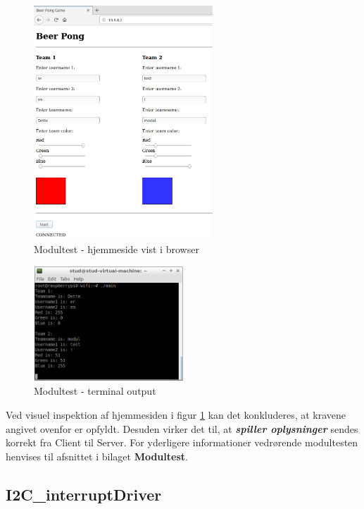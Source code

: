 \documentclass[Rapport/Rapport_main.tex]{subfiles}
\begin{document}
\begin{figure}[H]
    \centering
    \includegraphics[width=0.6\textwidth]{Modultest/WebPage/graphics/modultest_1.png}
    \caption{Modultest - hjemmeside vist i browser}
    \label{fig:webpage_modultest_rapport_1}
\end{figure}
\begin{figure}[H]
    \centering
    \includegraphics[width=0.5\textwidth]{Modultest/WebPage/graphics/modultest_2.png}
    \caption{Modultest - terminal output}
    \label{fig:webpage_modultest_rapport_2}
\end{figure}
Ved visuel inspektion af hjemmesiden i figur \ref{fig:webpage_modultest_rapport_1} kan det konkluderes, at kravene angivet ovenfor er opfyldt. Desuden virker det til, at \textit{\textbf{spiller oplysninger}} sendes korrekt fra Client til Server. For yderligere informationer vedrørende modultesten henvises til afsnittet  i bilaget \textbf{Modultest}.

\subsection{I2C\_interruptDriver}



\end{document}
